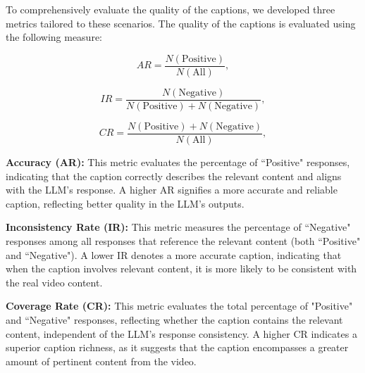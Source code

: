 To comprehensively evaluate the quality of the captions, we developed three metrics tailored to these scenarios. The quality of the captions is evaluated using the following measure:

\begin{equation}
AR = \dfrac{N(\text{Positive})}{N(\text{All})},
\end{equation}

\begin{equation}
IR = \dfrac{N(\text{Negative})}{N(\text{Positive}) + N(\text{Negative})},
\end{equation}

\begin{equation}
CR = \dfrac{N(\text{Positive}) + N(\text{Negative})}{N(\text{All})},
\end{equation}


\textbf{Accuracy (AR):} This metric evaluates the percentage of ``Positive" responses, indicating that the caption correctly describes the relevant content and aligns with the LLM's response. A higher AR signifies a more accurate and reliable caption, reflecting better quality in the LLM's outputs.

\textbf{Inconsistency Rate (IR):} This metric measures the percentage of ``Negative" responses among all responses that reference the relevant content (both ``Positive" and ``Negative"). A lower IR denotes a more accurate caption, indicating that when the caption involves relevant content, it is more likely to be consistent with the real video content.

\textbf{Coverage Rate (CR):} This metric evaluates the total percentage of "Positive" and ``Negative" responses, reflecting whether the caption contains the relevant content, independent of the LLM's response consistency. A higher CR indicates a superior caption richness, as it suggests that the caption encompasses a greater amount of pertinent content from the video.


